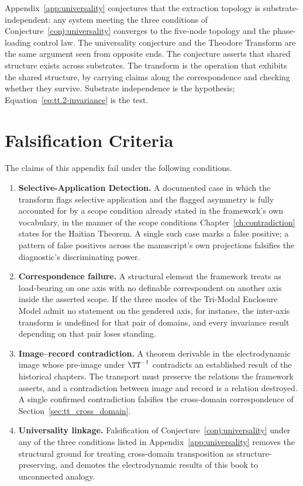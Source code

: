 Appendix~\ref{app:universality} conjectures that the extraction topology is substrate-independent:
any system meeting the three conditions of Conjecture~\ref{conj:universality} converges to the
five-node topology and the phase-loading control law. The universality conjecture and the Theodore
Transform are the same argument seen from opposite ends. The conjecture asserts that shared
structure exists across substrates. The transform is the operation that exhibits the shared
structure, by carrying claims along the correspondence and checking whether they survive.
Substrate independence is the hypothesis; Equation~\ref{eq:tt.2-invariance} is the test.

\section{Falsification Criteria}
\label{sec:tt_falsification}

The claims of this appendix fail under the following conditions.

\begin{enumerate}
    \item \textbf{Selective-Application Detection.} A documented case in which the transform flags
    selective application and the flagged asymmetry is fully accounted for by a scope condition
    already stated in the framework's own vocabulary, in the manner of the scope conditions
    Chapter~\ref{ch:contradiction} states for the Haitian Theorem. A single such case marks a
    false positive; a pattern of false positives across the manuscript's own projections falsifies
    the diagnostic's discriminating power.

    \item \textbf{Correspondence failure.} A structural element the framework treats as
    load-bearing on one axis with no definable correspondent on another axis inside the asserted
    scope. If the three modes of the Tri-Modal Enclosure Model admit no statement on the gendered
    axis, for instance, the inter-axis transform is undefined for that pair of domains, and every
    invariance result depending on that pair loses standing.

    \item \textbf{Image--record contradiction.} A theorem derivable in the electrodynamic image
    whose pre-image under $\TT^{-1}$ contradicts an established result of the historical
    chapters. The transport must preserve the relations the framework asserts, and a contradiction
    between image and record is a relation destroyed. A single confirmed contradiction falsifies
    the cross-domain correspondence of Section~\ref{sec:tt_cross_domain}.

    \item \textbf{Universality linkage.} Falsification of Conjecture~\ref{conj:universality} under
    any of the three conditions listed in Appendix~\ref{app:universality} removes the structural
    ground for treating cross-domain transposition as structure-preserving, and demotes the
    electrodynamic results of this book to unconnected analogy.
\end{enumerate}

